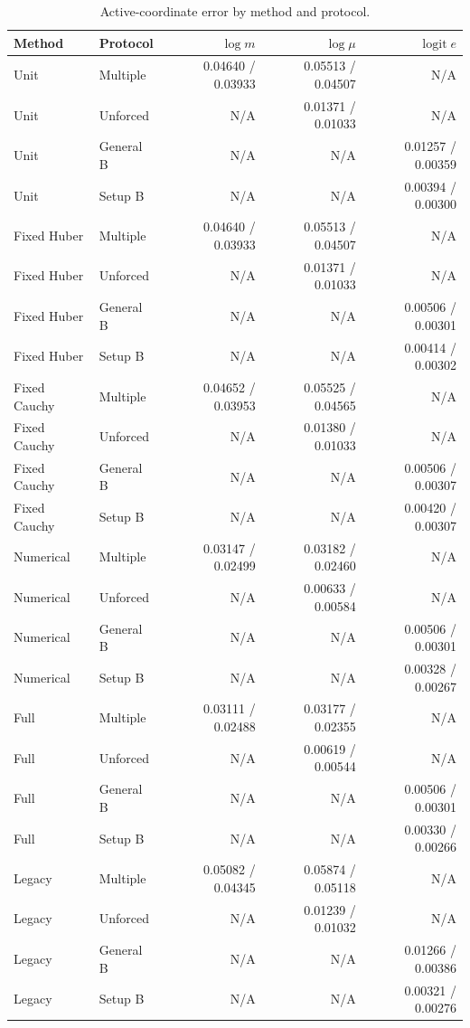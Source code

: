 \begingroup\scriptsize
\begin{longtable}{llrrr}
\caption{Active-coordinate error by method and protocol.}\\
\toprule Method & Protocol & $\log m$ & $\log\mu$ & $\operatorname{logit}e$\\\midrule\endhead
Unit & Multiple & 0.04640 / 0.03933 & 0.05513 / 0.04507 & N/A\\
Unit & Unforced & N/A & 0.01371 / 0.01033 & N/A\\
Unit & General B & N/A & N/A & 0.01257 / 0.00359\\
Unit & Setup B & N/A & N/A & 0.00394 / 0.00300\\
Fixed Huber & Multiple & 0.04640 / 0.03933 & 0.05513 / 0.04507 & N/A\\
Fixed Huber & Unforced & N/A & 0.01371 / 0.01033 & N/A\\
Fixed Huber & General B & N/A & N/A & 0.00506 / 0.00301\\
Fixed Huber & Setup B & N/A & N/A & 0.00414 / 0.00302\\
Fixed Cauchy & Multiple & 0.04652 / 0.03953 & 0.05525 / 0.04565 & N/A\\
Fixed Cauchy & Unforced & N/A & 0.01380 / 0.01033 & N/A\\
Fixed Cauchy & General B & N/A & N/A & 0.00506 / 0.00307\\
Fixed Cauchy & Setup B & N/A & N/A & 0.00420 / 0.00307\\
Numerical & Multiple & 0.03147 / 0.02499 & 0.03182 / 0.02460 & N/A\\
Numerical & Unforced & N/A & 0.00633 / 0.00584 & N/A\\
Numerical & General B & N/A & N/A & 0.00506 / 0.00301\\
Numerical & Setup B & N/A & N/A & 0.00328 / 0.00267\\
Full & Multiple & 0.03111 / 0.02488 & 0.03177 / 0.02355 & N/A\\
Full & Unforced & N/A & 0.00619 / 0.00544 & N/A\\
Full & General B & N/A & N/A & 0.00506 / 0.00301\\
Full & Setup B & N/A & N/A & 0.00330 / 0.00266\\
Legacy & Multiple & 0.05082 / 0.04345 & 0.05874 / 0.05118 & N/A\\
Legacy & Unforced & N/A & 0.01239 / 0.01032 & N/A\\
Legacy & General B & N/A & N/A & 0.01266 / 0.00386\\
Legacy & Setup B & N/A & N/A & 0.00321 / 0.00276\\

\end{longtable}
